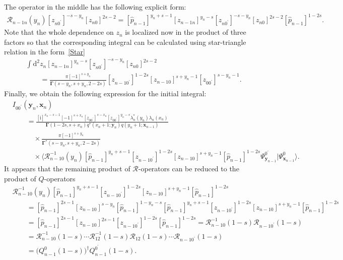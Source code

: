 \documentclass[pdftex]{sigma}
\renewcommand{\imath}{\mathrm{i}}
\numberwithin{equation}{section}
\begin{document}
The operator in the middle has the following explicit form:
\begin{gather*}
\mathcal{R}_{n-1 n}(y_n)
[z_{n 0^{\prime}}]^{-s-y_n} [z_{n0}]^{2s-2} =
[\hat{p}_{n-1}]^{y_n+s-1} [z_{n-1 n}]^{y_n-s}
[z_{n 0^{\prime}}]^{-s-y_n} [z_{n0}]^{2s-2}
[\hat{p}_{n-1}]^{1-2s}.
\end{gather*}
Note that the whole dependence on $z_n$ is localized now
in the product of three factors so that the
corresponding integral can be calculated using
star-triangle relation in the form~\eqref{Star}
\begin{align*}
&
\int \mathrm{d}^2 z_n [z_{n-1 n}]^{y_n-s}
[z_{n 0^{\prime}}]^{-s-y_n} [z_{n0}]^{2s-2} \\
& \qquad =
\frac{\pi [-1]^{s+y_n}}{\mathbf{\Gamma}(s-y_n,s+y_n,2-2s)}
[z_{n-1 0^{\prime}}]^{1-2s} [z_{n-1 0}]^{s+y_n-1} [z_{0 0^{\prime}}]^{s-y_n-1} .
\end{align*}
Finally, we obtain the following expression for the initial integral:
\begin{align*}
&
I_{0 0^{\prime}}(\bm{y}_n,\bm{x}_{n}) \\
& \qquad =
\frac{[\imath]^{x_n-s-1} [-1]^{s+x_n} [z_{0 0^{\prime}}]^{s-x_n}
[z_{0 0^{\prime}}]^{y_n-s} \lambda_n^\ast(y_n) \lambda_n(x_n)}
{\mathbf{\Gamma}(1-2s,s+x_n) q^{*}(x_n+1;\bm{y}_n) q(y_n+1;\bm{x}_{n-1})} \\
& \qquad\quad \times
\frac{\pi [-1]^{s+y_n}}{\mathbf{\Gamma}^{*}(s-y_n,s+y_n,2-2s)} \\
& \qquad\quad \times
\bigl\langle \mathcal{R}^{-1}_{n-1 0}(y_n)
[\hat{p}_{n-1}]^{y_n+s-1}
[z_{n-1 0^{\prime}}]^{1-2s} [z_{n-1 0}]^{s+y_n-1}
 [\hat{p}_{n-1}]^{1-2s} \Psi^{0^{\prime}}_{\bm{y}_{n-1}}|
\Psi^{0}_{\bm{x}_{n-1}}\bigr\rangle .
\end{align*}
It appears that the remaining product of $\mathcal{R}$-operators
can be reduced to the product of $Q$-operators
\begin{align*}
&
\mathcal{R}^{-1}_{n-1 0}(y_n)
[\hat{p}_{n-1}]^{y_n+s-1}
[z_{n-1 0^{\prime}}]^{1-2s} [z_{n-1 0}]^{s+y_n-1}
 [\hat{p}_{n-1}]^{1-2s} \\
&\qquad{} =
[\hat{p}_{n-1}]^{2s-1}
[z_{n-1 0}]^{s-y_n}
[\hat{p}_{n-1}]^{1-y_n-s}
[\hat{p}_{n-1}]^{y_n+s-1}
[z_{n-1 0^{\prime}}]^{1-2s} [z_{n-1 0}]^{s+y_n-1}
 [\hat{p}_{n-1}]^{1-2s} \\
&\qquad{} =
[\hat{p}_{n-1}]^{2s-1}
[z_{n-1 0}]^{2s-1}
[z_{n-1 0^{\prime}}]^{1-2s}
 [\hat{p}_{n-1}]^{1-2s} =
\mathcal{R}^{-1}_{n-1 0}(1-s) \mathcal{R}_{n-1 0^{\prime}}(1-s) \\
&\qquad{} =
\mathcal{R}^{-1}_{n-1 0}(1-s)\cdots
\mathcal{R}^{-1}_{12}(1-s)
\mathcal{R}_{12}(1-s)\cdots\mathcal{R}_{n-1 0^{\prime}}(1-s) \\
&\qquad{} =
\bigl(Q^{0}_{n-1}(1-s)\bigr)^{\dagger} Q^{0^{\prime}}_{n-1}(1-s) .
\end{align*}
\end{document}
